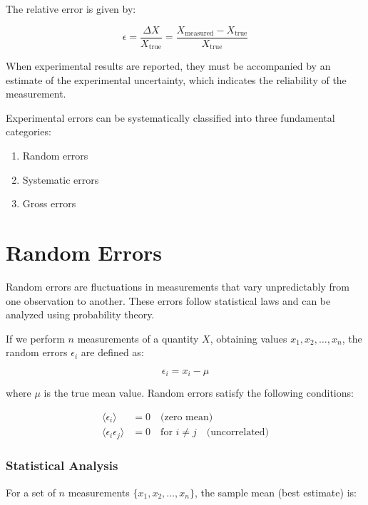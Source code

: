 \documentclass[twoside]{book}
\begin{document}
The relative error is given by:

\begin{equation*}
\epsilon = \frac{\Delta X}{X_{\text{true}}} = \frac{X_{\text{measured}} - X_{\text{true}}}{X_{\text{true}}}
\end{equation*}

When experimental results are reported, they must be accompanied by an estimate of the experimental uncertainty, which indicates the reliability of the measurement.

Experimental errors can be systematically classified into three fundamental categories:
\begin{enumerate}
\item Random errors
\item Systematic errors
\item Gross errors
\end{enumerate}

\section{Random Errors}

Random errors are fluctuations in measurements that vary unpredictably from one observation to another. These errors follow statistical laws and can be analyzed using probability theory.

If we perform $n$ measurements of a quantity $X$, obtaining values $x_1, x_2, \ldots, x_n$, the random errors $\epsilon_i$ are defined as:

\begin{equation*}
\epsilon_i = x_i - \mu
\end{equation*}

where $\mu$ is the true mean value. Random errors satisfy the following conditions:

\begin{align*}
\langle \epsilon_i \rangle &= 0 \quad \text{(zero mean)} \\
\langle \epsilon_i \epsilon_j \rangle &= 0 \quad \text{for } i \neq j \quad \text{(uncorrelated)}
\end{align*}

\subsubsection{Statistical Analysis}

For a set of $n$ measurements $\{x_1, x_2, \ldots, x_n\}$, the sample mean (best estimate) is:
\end{document}
